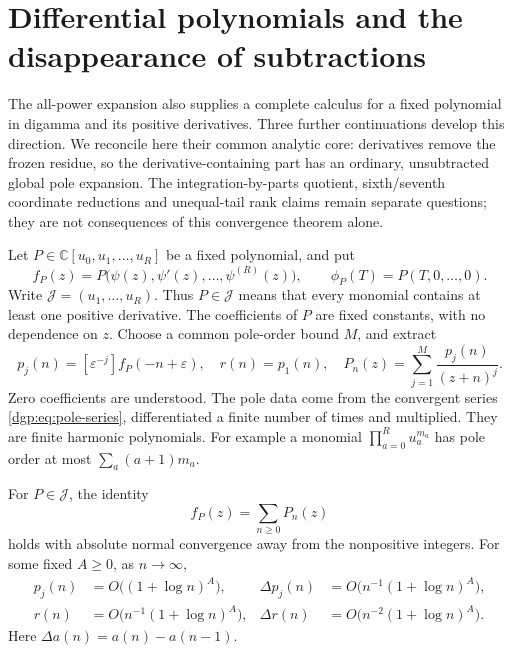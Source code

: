 
\section{Differential polynomials and the disappearance of subtractions}
\label{dpm:section}

The all-power expansion also supplies a complete calculus for a fixed
polynomial in digamma and its positive derivatives.  Three further
continuations \cite{dpm:reports} develop this direction.  We reconcile
here their common analytic core: derivatives remove the frozen residue,
so the derivative-containing part has an ordinary, unsubtracted global
pole expansion.  The integration-by-parts quotient, sixth/seventh
coordinate reductions and unequal-tail rank claims remain separate
questions; they are not consequences of this convergence theorem alone.

Let $P\in\mathbb C[u_0,u_1,\ldots,u_R]$ be a fixed polynomial, and put
\[
 f_P(z)=P\bigl(\psi(z),\psi'(z),\ldots,\psi^{(R)}(z)\bigr),\qquad
 \phi_P(T)=P(T,0,\ldots,0).
\]
Write $\mathcal J=(u_1,\ldots,u_R)$.  Thus $P\in\mathcal J$ means
that every monomial contains at least one positive derivative.
The coefficients of $P$ are fixed constants, with no dependence on $z$.
Choose a common pole-order bound $M$, and extract
\[
 p_j(n)=[\varepsilon^{-j}]f_P(-n+\varepsilon),\quad
 r(n)=p_1(n),\quad
 P_n(z)=\sum_{j=1}^M\frac{p_j(n)}{(z+n)^j}.
\]
Zero coefficients are understood.  The pole data come from the
convergent series \eqref{dgp:eq:pole-series}, differentiated a finite number
of times and multiplied.  They are finite harmonic polynomials.
For example a monomial $\prod_{a=0}^R u_a^{m_a}$ has pole order at
most $\sum_a(a+1)m_a$.

\begin{theorem}
\label{dpm:unsubtracted}
For $P\in\mathcal J$, the identity
\begin{equation}\label{dpm:ML}
 \boxed{f_P(z)=\sum_{n\ge0}P_n(z)}
\end{equation}
holds with absolute normal convergence away from the nonpositive
integers.  For some fixed $A\ge0$, as $n\to\infty$,
\begin{align}
 p_j(n)&=O\bigl((1+\log n)^A\bigr),&
 \Delta p_j(n)&=O\bigl(n^{-1}(1+\log n)^A\bigr),\label{dpm:coeff}\\
 r(n)&=O\bigl(n^{-1}(1+\log n)^A\bigr),&
 \Delta r(n)&=O\bigl(n^{-2}(1+\log n)^A\bigr).
 \label{dpm:residue}
\end{align}
Here $\Delta a(n)=a(n)-a(n-1)$.
\end{theorem}

